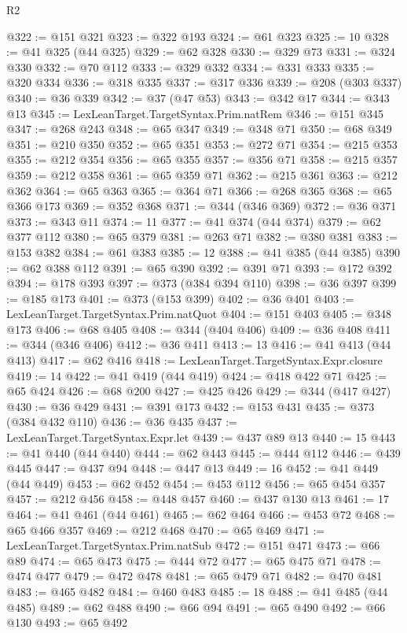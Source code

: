 \begin{lexlean}{R2}
\begin{coremodule}
@322 := @151 @321
@323 := @322 @193
@324 := @61 @323
@325 := 10
@328 := @41 @325 (@44 @325)
@329 := @62 @328
@330 := @329 @73
@331 := @324 @330
@332 := @70 @112
@333 := @329 @332
@334 := @331 @333
@335 := @320 @334
@336 := @318 @335
@337 := @317 @336
@339 := @208 (@303 @337)
@340 := @36 @339
@342 := @37 (@47 @53)
@343 := @342 @17
@344 := @343 @13
@345 := LexLeanTarget.TargetSyntax.Prim.natRem
@346 := @151 @345
@347 := @268 @243
@348 := @65 @347
@349 := @348 @71
@350 := @68 @349
@351 := @210 @350
@352 := @65 @351
@353 := @272 @71
@354 := @215 @353
@355 := @212 @354
@356 := @65 @355
@357 := @356 @71
@358 := @215 @357
@359 := @212 @358
@361 := @65 @359 @71
@362 := @215 @361
@363 := @212 @362
@364 := @65 @363
@365 := @364 @71
@366 := @268 @365
@368 := @65 @366 @173
@369 := @352 @368
@371 := @344 (@346 @369)
@372 := @36 @371
@373 := @343 @11
@374 := 11
@377 := @41 @374 (@44 @374)
@379 := @62 @377 @112
@380 := @65 @379
@381 := @263 @71
@382 := @380 @381
@383 := @153 @382
@384 := @61 @383
@385 := 12
@388 := @41 @385 (@44 @385)
@390 := @62 @388 @112
@391 := @65 @390
@392 := @391 @71
@393 := @172 @392
@394 := @178 @393
@397 := @373 (@384 @394 @110)
@398 := @36 @397
@399 := @185 @173
@401 := @373 (@153 @399)
@402 := @36 @401
@403 := LexLeanTarget.TargetSyntax.Prim.natQuot
@404 := @151 @403
@405 := @348 @173
@406 := @68 @405
@408 := @344 (@404 @406)
@409 := @36 @408
@411 := @344 (@346 @406)
@412 := @36 @411
@413 := 13
@416 := @41 @413 (@44 @413)
@417 := @62 @416
@418 := LexLeanTarget.TargetSyntax.Expr.closure
@419 := 14
@422 := @41 @419 (@44 @419)
@424 := @418 @422 @71
@425 := @65 @424
@426 := @68 @200
@427 := @425 @426
@429 := @344 (@417 @427)
@430 := @36 @429
@431 := @391 @173
@432 := @153 @431
@435 := @373 (@384 @432 @110)
@436 := @36 @435
@437 := LexLeanTarget.TargetSyntax.Expr.let
@439 := @437 @89 @13
@440 := 15
@443 := @41 @440 (@44 @440)
@444 := @62 @443
@445 := @444 @112
@446 := @439 @445
@447 := @437 @94
@448 := @447 @13
@449 := 16
@452 := @41 @449 (@44 @449)
@453 := @62 @452
@454 := @453 @112
@456 := @65 @454 @357
@457 := @212 @456
@458 := @448 @457
@460 := @437 @130 @13
@461 := 17
@464 := @41 @461 (@44 @461)
@465 := @62 @464
@466 := @453 @72
@468 := @65 @466 @357
@469 := @212 @468
@470 := @65 @469
@471 := LexLeanTarget.TargetSyntax.Prim.natSub
@472 := @151 @471
@473 := @66 @89
@474 := @65 @473
@475 := @444 @72
@477 := @65 @475 @71
@478 := @474 @477
@479 := @472 @478
@481 := @65 @479 @71
@482 := @470 @481
@483 := @465 @482
@484 := @460 @483
@485 := 18
@488 := @41 @485 (@44 @485)
@489 := @62 @488
@490 := @66 @94
@491 := @65 @490
@492 := @66 @130
@493 := @65 @492

\end{coremodule}
\end{lexlean}

